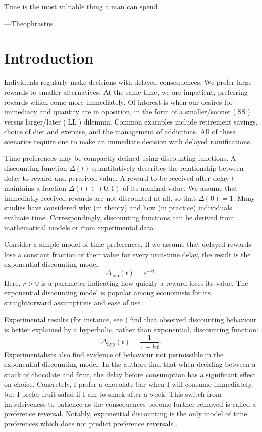 \documentclass[titlepage, hidelinks, 12pt]{article}
\theoremstyle{plain}
\theoremstyle{remark}
\theoremstyle{definition}
\DeclareMathOperator{\smallersooner}{SS}
\DeclareMathOperator{\largerlater}{LL}
\DeclareMathOperator{\hyp}{hyp}
\begin{document}
\epigraph{Time is the most valuable thing a man can spend.}{---Theophrastus}
\section{Introduction}


Individuals regularly make decisions with delayed consequences. 
We prefer large rewards to smaller alternatives. At the same time, 
we are impatient, preferring rewards which come more immediately.
Of interest is when our desires for immediacy and quantity are in oposition, in the form of 
a smaller/sooner ($\smallersooner$) versus larger/later ($\largerlater$) dilemma. 
Common examples include retirement savings, choice of diet and 
exercise, and the management of addictions. All of these scenarios require one to make an immediate decision with delayed
ramifications. 


Time preferences may be compactly defined using discounting functions. 
A discounting function $\Delta(t)$ quantitatively describes the relationship between delay to reward and perceived value. A reward to be
received after delay $t$ maintains a fraction $\Delta(t)\in(0, 1)$ of its nominal value. We assume that immediatly received
rewards are not discounted at all, so that $\Delta(0) = 1$. Many studies
have considered why (in theory) and how (in practice) individuals evaluate time. Correspondingly, discounting functions
can be derived from mathematical models or from experimental data. 

Consider a simple model of time preferences.
If we assume that delayed rewards lose a constant fraction of their value for every unit-time delay, the result is the exponential
discounting model: 
\begin{equation}
    \Delta_{\exp}(t) = e^{-r t}.
\end{equation}
Here, $r>0$ is a parameter indicating how quickly a reward loses its value. The exponential discounting model is popular among economists
for its straightforward assumptions and ease of use \cite{sozou98}. 


Experimental results (for instance, see \cite{maia09, green04, doyle12}) find that observed discounting behaviour is better explained
by a hyperbolic, rather than exponential, discounting function:
\begin{equation}
    \Delta_{\hyp}(t) = \frac{1}{1+ht}.
\end{equation}
Experimentalists also find evidence of behaviour not permissible in the exponential discounting model. 
In \cite{read98} the authors find that
when deciding between a snack of chocolate and fruit, the delay before consumption has a significant effect on choice. Concretely, I prefer a chocolate bar
when I will consume immediately, but I prefer fruit salad if I am to snack after a week. This switch from impulsiveness to patience as
the consequences become further removed is called a preference reversal. 
Notably, exponential discounting is the only model of time preferences which does not predict preference reversals
\cite{strotz55}. 
\end{document}
